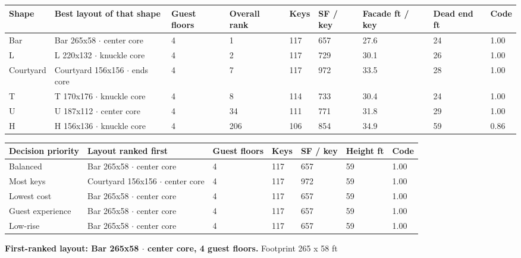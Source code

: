 \begingroup{}\endgroup
{\footnotesize\begin{longtable}{p{1.61cm}p{4.37cm}p{1.04cm}p{1.14cm}p{0.85cm}p{1.04cm}p{1.33cm}p{1.14cm}p{0.85cm}}
\toprule
\textbf{Shape} & \textbf{Best layout of that shape} & \textbf{Guest floors} & \textbf{Overall rank} & \textbf{Keys} & \textbf{SF / key} & \textbf{Facade ft / key} & \textbf{Dead end ft} & \textbf{Code} \\ \midrule \endhead
Bar & Bar 265x58 $\cdot$ center core & 4 & 1 & 117 & 657 & 27.6 & 24 & 1.00 \\
L & L 220x132 $\cdot$ knuckle core & 4 & 2 & 117 & 729 & 30.1 & 26 & 1.00 \\
Courtyard & Courtyard 156x156 $\cdot$ ends core & 4 & 7 & 117 & 972 & 33.5 & 28 & 1.00 \\
T & T 170x176 $\cdot$ knuckle core & 4 & 8 & 114 & 733 & 30.4 & 24 & 1.00 \\
U & U 187x112 $\cdot$ center core & 4 & 34 & 111 & 771 & 31.8 & 29 & 1.00 \\
H & H 156x136 $\cdot$ knuckle core & 4 & 206 & 106 & 854 & 34.9 & 59 & 0.86 \\
\bottomrule
\end{longtable}}\addtocounter{table}{-1}
\begingroup{}\endgroup
{\footnotesize\begin{longtable}{p{2.66cm}p{4.94cm}p{1.23cm}p{0.95cm}p{1.14cm}p{1.23cm}p{0.95cm}}
\toprule
\textbf{Decision priority} & \textbf{Layout ranked first} & \textbf{Guest floors} & \textbf{Keys} & \textbf{SF / key} & \textbf{Height ft} & \textbf{Code} \\ \midrule \endhead
Balanced & Bar 265x58 $\cdot$ center core & 4 & 117 & 657 & 59 & 1.00 \\
Most keys & Courtyard 156x156 $\cdot$ center core & 4 & 117 & 972 & 59 & 1.00 \\
Lowest cost & Bar 265x58 $\cdot$ center core & 4 & 117 & 657 & 59 & 1.00 \\
Guest experience & Bar 265x58 $\cdot$ center core & 4 & 117 & 657 & 59 & 1.00 \\
Low-rise & Bar 265x58 $\cdot$ center core & 4 & 117 & 657 & 59 & 1.00 \\
\bottomrule
\end{longtable}}\addtocounter{table}{-1}
\textbf{First-ranked layout: Bar 265x58 $\cdot$ center core, 4 guest floors.} Footprint 265 x 58 ft
